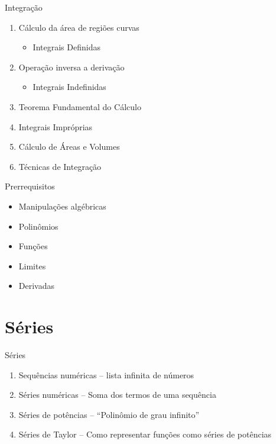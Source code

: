 \begin{frame}{Integração}
  \begin{enumerate}[<+->]
    \item Cálculo da área de regiões curvas
    \begin{itemize}
      \item[] Integrais Definidas
    \end{itemize}
    \item Operação inversa a derivação
    \begin{itemize}
      \item[] Integrais Indefinidas
    \end{itemize}
    \item Teorema Fundamental do Cálculo
    \item Integrais Impróprias
    \item Cálculo de Áreas e Volumes \\[5mm]
    \item Técnicas de Integração
  \end{enumerate}
\end{frame}

\begin{frame}{Prerrequisitos}
  \begin{itemize}[<+->]
    \item Manipulações algébricas
    \item Polinômios
    \item Funções
    \item Limites
    \item Derivadas
  \end{itemize}
\end{frame}

\section{Séries}

\begin{frame}{Séries}
  \begin{enumerate}[<+->]
    \item Sequências numéricas \tabto{40mm} -- lista infinita de números
    \item Séries numéricas     \tabto{40mm} -- Soma dos termos de uma sequência \\[5mm]
    \item Séries de potências  \tabto{40mm} -- ``Polinômio de grau infinito''
    \item Séries de Taylor     \tabto{40mm} -- Como representar funções como séries de potências
  \end{enumerate}
\end{frame}

